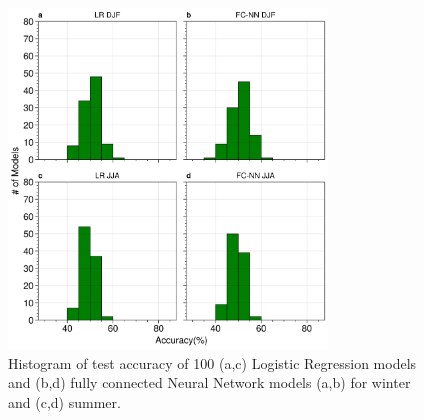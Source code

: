 \documentclass{ametsocV6.1}
\begin{document}
\begin{figure}[t]
  \noindent\includegraphics[width=20pc,angle=0]{Figure4.jpg}
  \caption{Histogram of test accuracy of 100 (a,c) Logistic Regression models and (b,d) fully connected Neural Network models (a,b) for winter and (c,d) summer.}\label{f4}
\end{figure}
\end{document}
